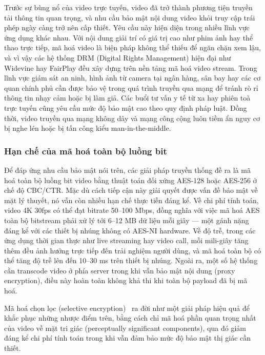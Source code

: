 Trước sự bùng nổ của video trực tuyến, video đã trở thành phương tiện truyền tải thông tin quan trọng, và nhu cầu bảo mật nội dung video khỏi truy cập trái phép ngày càng trở nên cấp thiết. Yêu cầu này hiện diện trong nhiều lĩnh vực ứng dụng khác nhau. Với nội dung giải trí có giá trị cao như phim ảnh hay thể thao trực tiếp, mã hoá video là biện pháp không thể thiếu để ngăn chặn xem lậu, và vì vậy các hệ thống DRM (Digital Rights Management) hiện đại như Widevine hay FairPlay đều xây dựng trên nền tảng mã hoá video stream. Trong lĩnh vực giám sát an ninh, hình ảnh từ camera tại ngân hàng, sân bay hay các cơ quan chính phủ cần được bảo vệ trong quá trình truyền qua mạng để tránh rò rỉ thông tin nhạy cảm hoặc bị làm giả. Các buổi tư vấn y tế từ xa hay phiên toà trực tuyến cũng yêu cầu mức độ bảo mật cao theo quy định pháp luật. Đồng thời, video truyền qua mạng không dây và mạng công cộng luôn tiềm ẩn nguy cơ bị nghe lén hoặc bị tấn công kiểu man-in-the-middle.

\subsubsection{Hạn chế của mã hoá toàn bộ luồng bit}

Để đáp ứng nhu cầu bảo mật nói trên, các giải pháp truyền thống đề ra là mã hoá toàn bộ luồng bit video bằng thuật toán đối xứng AES-128 hoặc AES-256 ở chế độ CBC/CTR. Mặc dù cách tiếp cận này giải quyết được vấn đề bảo mật về mặt lý thuyết, nó vẫn còn nhiều hạn chế thực tiễn đáng kể. Về chi phí tính toán, video 4K 30fps có thể đạt bitrate 50--100 Mbps, đồng nghĩa với việc mã hoá AES toàn bộ bitstream phải xử lý tới 6--12 MB dữ liệu mỗi giây --- một gánh nặng đáng kể với các thiết bị nhúng không có AES-NI hardware. Về độ trễ, trong các ứng dụng thời gian thực như live streaming hay video call, mỗi mili-giây tăng thêm đều ảnh hưởng trực tiếp đến trải nghiệm người dùng, và mã hoá toàn bộ có thể tăng độ trễ lên đến 10--30 ms trên thiết bị nhúng. Ngoài ra, một số hệ thống cần transcode video ở phía server trong khi vẫn bảo mật nội dung (proxy encryption), điều này hoàn toàn không khả thi khi toàn bộ payload đã bị mã hoá.

Mã hoá chọn lọc (selective encryption)~\cite{cheng_selective} ra đời như một giải pháp hiệu quả để khắc phục những nhược điểm trên, bằng cách chỉ mã hoá phần quan trọng nhất của video về mặt tri giác (perceptually significant components), qua đó giảm đáng kể chi phí tính toán trong khi vẫn đảm bảo mức độ bảo mật thị giác cần thiết.

